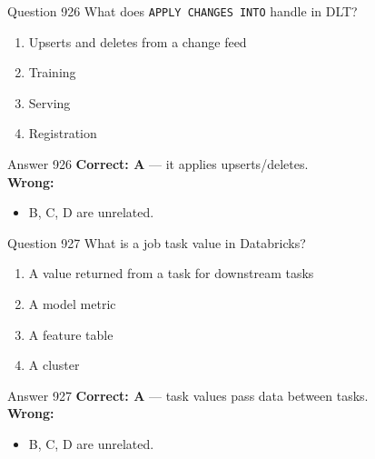 \documentclass[aspectratio=169,11pt]{beamer}
\begin{document}
	\begin{frame}{Question 926}
		What does \texttt{APPLY CHANGES INTO} handle in DLT?
		\begin{enumerate}[label=\Alph*.]
			\item Upserts and deletes from a change feed
			\item Training
			\item Serving
			\item Registration
		\end{enumerate}
	\end{frame}
	\begin{frame}{Answer 926}
		\textbf{Correct: A} --- it applies upserts/deletes.\\
		\vspace{0.5em}
		\textbf{Wrong:}
		\begin{itemize}
			\item B, C, D are unrelated.
		\end{itemize}
	\end{frame}
	
	\begin{frame}{Question 927}
		What is a job task value in Databricks?
		\begin{enumerate}[label=\Alph*.]
			\item A value returned from a task for downstream tasks
			\item A model metric
			\item A feature table
			\item A cluster
		\end{enumerate}
	\end{frame}
	\begin{frame}{Answer 927}
		\textbf{Correct: A} --- task values pass data between tasks.\\
		\vspace{0.5em}
		\textbf{Wrong:}
		\begin{itemize}
			\item B, C, D are unrelated.
		\end{itemize}
	\end{frame}
	
\end{document}

